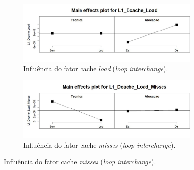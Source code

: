 \documentclass[12pt,a4paper]{article}
\begin{document}
\begin{figure}[H]
\centering

\begin{subfigure}{0.49\linewidth}
    \includegraphics[width=\linewidth]{Figures/fig_fatores_cache_load.jpg}
    \caption{Influência do fator cache \textit{load} (\textit{loop interchange}).}
    \label{sub_fig:cache_loads}
\end{subfigure}
\hfill
\begin{subfigure}{0.49\linewidth}
    \includegraphics[width=\linewidth]{Figures/fig_fatores_cache_misses.jpg}
    \caption{Influência do fator cache \textit{misses} (\textit{loop interchange}).}
    \label{sub_fig:cache_misses}
\end{subfigure}


\end{figure}
\end{document}
